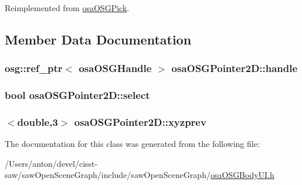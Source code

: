 Reimplemented from \hyperlink{classosa_o_s_g_pick_a94f0070f479012ffa3c5717c617072c9}{osa\+O\+S\+G\+Pick}.



\subsection{Member Data Documentation}
\hypertarget{classosa_o_s_g_pointer2_d_a84c0eeeb907fe3c630ef982cbe51d34a}{}
\subsubsection[{handle}]{\setlength{\rightskip}{0pt plus 5cm}osg\+::ref\+\_\+ptr$<$ {\bf osa\+O\+S\+G\+Handle} $>$ osa\+O\+S\+G\+Pointer2\+D\+::handle\hspace{0.3cm}{\ttfamily [protected]}}\label{classosa_o_s_g_pointer2_d_a84c0eeeb907fe3c630ef982cbe51d34a}
\hypertarget{classosa_o_s_g_pointer2_d_a4f98fd27df2ef100b7bd58673b2578de}{}
\subsubsection[{select}]{\setlength{\rightskip}{0pt plus 5cm}bool osa\+O\+S\+G\+Pointer2\+D\+::select\hspace{0.3cm}{\ttfamily [protected]}}\label{classosa_o_s_g_pointer2_d_a4f98fd27df2ef100b7bd58673b2578de}
\hypertarget{classosa_o_s_g_pointer2_d_a182ee22feed750daa7d6ee2850e39631}{}
\subsubsection[{xyzprev}]{$<$double,3$>$ osa\+O\+S\+G\+Pointer2\+D\+::xyzprev\hspace{0.3cm}{\ttfamily [protected]}}\label{classosa_o_s_g_pointer2_d_a182ee22feed750daa7d6ee2850e39631}


The documentation for this class was generated from the following file\+:\begin{DoxyCompactItemize}
\item 
/\+Users/anton/devel/cisst-\/saw/saw\+Open\+Scene\+Graph/include/saw\+Open\+Scene\+Graph/\hyperlink{osa_o_s_g_body_u_i_8h}{osa\+O\+S\+G\+Body\+U\+I.\+h}\end{DoxyCompactItemize}
